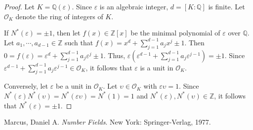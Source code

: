 \documentclass[12pt]{article}
\begin{document}
\begin{proof}
Let $K=\mathbb{Q}(\varepsilon)$.  Since $\varepsilon$ is an algebraic integer, $d=[K\!:\!\mathbb{Q}]$ is finite.  Let $\mathcal{O}_K$ denote the ring of integers of $K$.

If $N^*(\varepsilon) = \pm 1$, then let $f(x) \in \mathbb{Z}[x]$ be the minimal polynomial of $\varepsilon$ over $\mathbb{Q}$.  Let $a_1, \cdots , a_{d-1} \in \mathbb{Z}$ such that $\displaystyle f(x)=x^d+\sum_{j=1}^{d-1} a_j x^j \pm 1$.  Then $\displaystyle 0=f(\varepsilon)=\varepsilon^d+\sum_{j=1}^{d-1} a_j \varepsilon^j \pm 1$.  Thus, $\displaystyle \varepsilon \left( \varepsilon^{d-1}+\sum_{j=1}^{d-1} a_j \varepsilon^{j-1} \right) = \pm 1$.  Since $\displaystyle \varepsilon^{d-1}+\sum_{j=1}^{d-1} a_j \varepsilon^{j-1} \in \mathcal{O}_K$, it follows that $\varepsilon$ is a unit in $\mathcal{O}_K$.

Conversely, let $\varepsilon$ be a unit in $\mathcal{O}_K$.  Let $\upsilon \in \mathcal{O}_K$ with $\varepsilon \upsilon = 1$.  Since $N^*(\varepsilon) N^*(\upsilon) = N^*(\varepsilon \upsilon)=N^*(1)=1$ and $N^*(\varepsilon), N^*(\upsilon) \in \mathbb{Z}$, it follows that $N^*(\varepsilon) = \pm 1$.  \end{proof}
\begin{thebibliography}{9}
 Marcus, Daniel A. {\em Number Fields}.  New York: Springer-Verlag, 1977.
\end{thebibliography}
\end{document}
